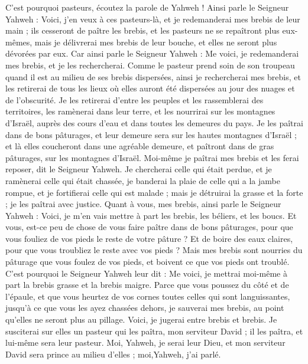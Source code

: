 \begin{multicols}{2}
C'est pourquoi pasteurs, écoutez la parole de Yahweh !
Ainsi parle le Seigneur Yahweh : Voici, j'en veux à ces pasteurs-là, et je redemanderai mes brebis de leur main ; ils cesseront de paître les brebis, et les pasteurs ne se repaîtront plus eux-mêmes, mais je délivrerai mes brebis de leur bouche, et elles ne seront plus dévorées par eux.
Car ainsi parle le Seigneur Yahweh : Me voici, je redemanderai mes brebis, et je les rechercherai.
Comme le pasteur prend soin de son troupeau quand il est au milieu de ses brebis dispersées, ainsi je rechercherai mes brebis, et les retirerai de tous les lieux où elles auront été dispersées au jour des nuages et de l'obscurité.
Je les retirerai d'entre les peuples et les rassemblerai des territoires, les ramènerai dans leur terre, et les nourrirai sur les montagnes d'Israël, auprès des cours d'eau et dans toutes les demeures du pays.
Je les paîtrai dans de bons pâturages, et leur demeure sera sur les hautes montagnes d'Israël ; et là elles coucheront dans une agréable demeure, et paîtront dans de gras pâturages, sur les montagnes d'Israël.
Moi-même je paîtrai mes brebis et les ferai reposer, dit le Seigneur Yahweh.
Je chercherai celle qui était perdue, et je ramènerai celle qui était chassée, je banderai la plaie de celle qui a la jambe rompue, et je fortifierai celle qui est malade ; mais je détruirai la grasse et la forte ; je les paîtrai avec justice.
Quant à vous, mes brebis, ainsi parle le Seigneur Yahweh : Voici, je m'en vais mettre à part les brebis, les béliers, et les boucs.
Et vous, est-ce peu de chose de vous faire paître dans de bons pâturages, pour que vous fouliez de vos pieds le reste de votre pâture ? Et de boire des eaux claires, pour que vous troubliez le reste avec vos pieds ?
Mais mes brebis sont nourries du pâturage que vous foulez de vos pieds, et boivent ce que vos pieds ont troublé.
C'est pourquoi le Seigneur Yahweh leur dit : Me voici, je mettrai moi-même à part la brebis grasse et la brebis maigre.
Parce que vous poussez du côté et de l'épaule, et que vous heurtez de vos cornes toutes celles qui sont languissantes, jusqu'à ce que vous les ayez chassées dehors,
je sauverai mes brebis, au point qu'elles ne seront plus au pillage. Voici, je jugerai entre brebis et brebis.
Je susciterai sur elles un pasteur qui les paîtra, mon serviteur David ; il les paîtra, et lui-même sera leur pasteur.
Moi, Yahweh, je serai leur Dieu, et mon serviteur David sera prince au milieu d'elles ; moi,Yahweh, j'ai parlé.

\end{multicols}

